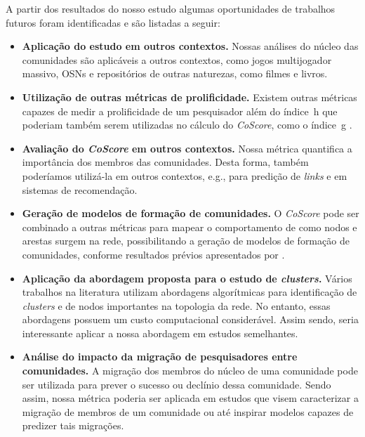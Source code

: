 A partir dos resultados do nosso estudo algumas oportunidades de trabalhos futuros foram identificadas e são listadas a seguir:

\begin{itemize}
  \item \textbf{Aplicação do estudo em outros contextos.} Nossas análises do núcleo das comunidades são aplicáveis a outros 
		contextos, como jogos multijogador massivo, OSNs e repositórios de outras 
		naturezas, como filmes e livros.
  \item \textbf{Utilização de outras métricas de prolificidade.} Existem outras métricas capazes de medir a 
		prolificidade de um pesquisador além do índice~h que poderiam também serem utilizadas no cálculo do 
		\textit{CoScore}, como o índice~g \citep{Egghe2006}.
  \item \textbf{Avaliação do \textit{CoScore} em outros contextos.} Nossa métrica quantifica a importância dos 
	        membros das comunidades. Desta forma, também poderíamos utilizá-la em outros contextos, e.g., para predição 
	        de \textit{links} e em sistemas de recomendação.
  \item \textbf{Geração de modelos de formação de comunidades.} O \textit{CoScore} pode ser combinado a outras
	        métricas para mapear o comportamento de como nodos e arestas surgem na rede, possibilitando a 
	        geração de modelos de formação de comunidades, conforme resultados prévios apresentados por \cite{Leskovec2005, Leskovec2008}.
  \item \textbf{Aplicação da abordagem proposta para o estudo de \textit{clusters}.} Vários trabalhos na literatura utilizam
	        abordagens algorítmicas para identificação de \textit{clusters} e de nodos importantes na topologia da rede. No entanto, 
	        essas abordagens possuem um custo computacional considerável. Assim sendo, seria interessante aplicar a nossa abordagem 
	        em estudos semelhantes.
  \item \textbf{Análise do impacto da migração de pesquisadores entre comunidades.} A migração dos membros do núcleo de uma comunidade
		pode ser utilizada para prever o sucesso ou declínio dessa comunidade. Sendo assim, nossa métrica poderia ser aplicada
		em estudos que visem caracterizar a migração de membros de um comunidade ou até inspirar modelos capazes de predizer tais migrações.
\end{itemize}



